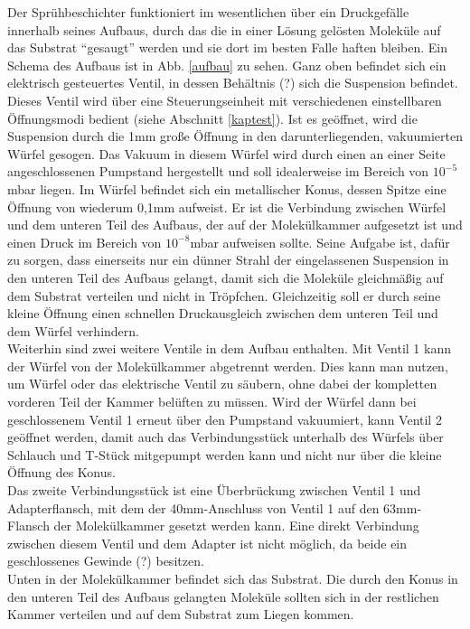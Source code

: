 Der Sprühbeschichter funktioniert im wesentlichen über ein Druckgefälle innerhalb seines Aufbaus, durch das
die in einer Lösung gelösten Moleküle auf das Substrat "`gesaugt"' werden und sie dort im besten
Falle haften bleiben. 
% 
Ein Schema des Aufbaus ist in Abb. \ref{aufbau} zu sehen. Ganz oben befindet sich ein elektrisch
gesteuertes Ventil, in dessen Behältnis (?) sich die Suspension befindet. Dieses Ventil wird über eine
Steuerungseinheit mit verschiedenen einstellbaren Öffnungsmodi bedient (siehe Abschnitt \ref{kaptest}). Ist es
geöffnet, wird die Suspension durch die 1mm große Öffnung in den darunterliegenden, vakuumierten Würfel
gesogen. Das Vakuum in diesem Würfel wird durch einen an einer Seite angeschlossenen Pumpstand hergestellt
und soll idealerweise im Bereich von $10^{-5}$mbar liegen. Im Würfel befindet sich ein metallischer
Konus, dessen Spitze eine Öffnung von wiederum 0,1mm aufweist. Er ist die Verbindung zwischen Würfel und dem
unteren Teil des Aufbaus, der auf der Molekülkammer aufgesetzt ist und einen Druck im Bereich von
$10^{-8}$mbar aufweisen sollte.  
Seine Aufgabe ist, dafür zu sorgen, dass einerseits nur ein dünner Strahl der eingelassenen Suspension in
den unteren Teil des Aufbaus gelangt, damit sich die Moleküle gleichmäßig auf dem Substrat verteilen und
nicht in Tröpfchen. Gleichzeitig soll er durch seine kleine Öffnung einen schnellen Druckausgleich zwischen
dem unteren Teil und dem Würfel verhindern. \\
Weiterhin sind zwei weitere Ventile in dem Aufbau enthalten. Mit Ventil 1 kann der Würfel von der
Molekülkammer abgetrennt werden. Dies kann man nutzen, um Würfel oder das elektrische Ventil zu säubern, ohne
dabei der kompletten vorderen Teil der Kammer belüften zu müssen. Wird der Würfel dann bei geschlossenem
Ventil 1 erneut über den Pumpstand vakuumiert, kann Ventil 2 geöffnet werden, damit auch das Verbindungsstück
unterhalb des Würfels über Schlauch und T-Stück mitgepumpt werden kann und nicht nur über die kleine Öffnung
des Konus.\\
Das zweite Verbindungsstück ist eine Überbrückung zwischen Ventil 1 und Adapterflansch, mit dem
der 40mm-Anschluss von Ventil 1 %
auf den 63mm-Flansch der Molekülkammer gesetzt werden kann. Eine direkt Verbindung zwischen diesem
Ventil und dem Adapter ist nicht möglich, da beide ein geschlossenes Gewinde (?) besitzen.\\
Unten in der Molekülkammer befindet sich das Substrat. Die durch den Konus in den unteren Teil des Aufbaus
gelangten Moleküle sollten sich in der restlichen Kammer verteilen und auf dem Substrat zum Liegen kommen.


